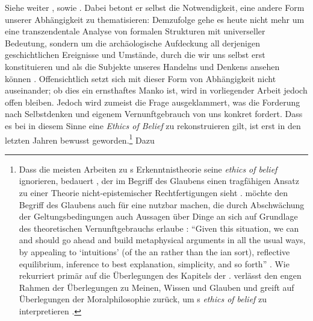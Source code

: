 {{Siehe weiter \cite{Foucault:WasistAufklaerung1990}, sowie
\cite{Foucault:WasistKritik?1992}. Dabei betont er selbst die Notwendigkeit,
eine andere Form unserer Abhängigkeit zu thematisieren: Demzufolge gehe es
heute nicht mehr um eine transzendentale Analyse von formalen Strukturen mit
universeller Bedeutung, sondern um die archäologische Aufdeckung all derjenigen
geschichtlichen Ereignisse und Umstände, durch die wir uns selbst erst
konstituieren und als die Subjekte unseres Handelns und Denkens ansehen können
\parencite[vgl.][]{Foucault:WasistAufklaerung1990}. Offensichtlich setzt sich
 mit dieser Form von Abhängigkeit nicht auseinander; ob
dies ein ernsthaftes Manko ist, wird in vorliegender Arbeit jedoch offen
bleiben.}} Jedoch wird zumeist die Frage ausgeklammert, was die Forderung nach
Selbstdenken und eigenem Vernunftgebrauch von uns konkret fordert. Dass es bei
 in diesem Sinne eine \emph{Ethics of Belief} zu
rekonstruieren gilt, ist erst in den letzten Jahren bewusst
geworden.\footnote{Dass die meisten Arbeiten zu s
Erkenntnistheorie seine \emph{ethics of belief} ignorieren, bedauert
, der im Begriff des Glaubens einen
tragfähigen Ansatz zu einer Theorie nicht-epistemischer Rechtfertigungen sieht
\parencite[vgl.][]{Chignell:KantsConceptsofJustification2007}.
 möchte den Begriff des
Glaubens auch für eine  nutzbar
machen, die durch Abschwächung der Geltungsbedingungen auch Aussagen über Dinge an sich auf Grundlage des
theoretischen Vernunftgebrauchs erlaube
\parencite[vgl.][335--360]{Chignell:BeliefinKant2007}: \enquote{Given
  this situation, we can and should go ahead and build metaphysical
  arguments in all the usual ways, by appealing to
  \enquote{intuitions} (of the an rather than the
  ian sort), reflective equilibrium, inference to
best explanation, simplicity, and so forth} \parencite[][360]{Chignell:BeliefinKant2007}.
Wie  rekurriert
 primär auf die
Überlegungen des Kapitels  der
\parencite[vgl.][]{Stevenson:OpinionBelieforFaithandKnowledge2003}.
 verlässt den engen Rahmen
der Überlegungen zu Meinen, Wissen und Glauben und greift auf Überlegungen der
Moralphilosophie zurück, um s \emph{ethics of belief} zu
interpretieren \parencite[vgl.][]{Cohen:KantontheEthicsofBelief2014}.} Dazu
